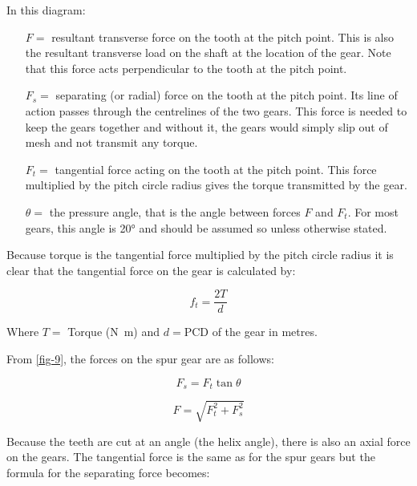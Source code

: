 In this diagram:

\begin{itemize}
  \item[$F=$] resultant transverse force on the tooth at the pitch point. This is also the resultant transverse load on the shaft at the location of the gear. Note that this force acts perpendicular to the tooth at the pitch point.
  \item[$F_s=$] separating (or radial) force on the tooth at the pitch point. Its line of action passes through the centrelines of the two gears. This force is needed to keep the gears together and without it, the gears would simply slip out of mesh and not transmit any torque.
  \item[$F_t=$] tangential force acting on the tooth at the pitch point. This force multiplied by the pitch circle radius gives the torque transmitted by the gear.
  \item[$\theta=$] the pressure angle, that is the angle between forces $F$ and $F_t$. For most gears, this angle is \ang{20} and should be assumed so unless otherwise stated.
\end{itemize}

Because torque is the tangential force multiplied by the pitch circle radius it is clear that the tangential force on the gear is calculated by:

\begin{equation}
  f_t = \frac{2T}{d}
\end{equation}

Where $T=$ Torque (\si{\newton\metre}) and $d=\text{PCD}$ of the gear in metres.

From \cref{fig-9}, the forces on the spur gear are as follows:


\begin{equation}
  F_s = F_t\tan\theta
\end{equation}


\begin{equation}
  F=\sqrt{F_t^2+F_s^2}
\end{equation}

Because the teeth are cut at an angle (the helix angle), there is also an axial force on the gears. The tangential force is the same as for the spur gears but the formula for the separating force becomes:

